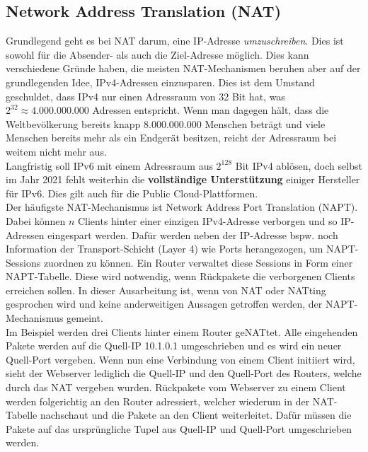\subsection{Network Address Translation (NAT)}
Grundlegend geht es bei NAT darum, eine IP-Adresse \textit{umzuschreiben}. Dies ist sowohl für die Absender- als auch die Ziel-Adresse möglich. Dies kann verschiedene Gründe haben, die meisten NAT-Mechanismen beruhen aber auf der grundlegenden Idee, IPv4-Adressen einzusparen. Dies ist dem Umstand geschuldet, dass IPv4 nur einen Adressraum von 32 Bit hat, was $2^{32} \approx 4.000.000.000$ Adressen entspricht. Wenn man dagegen hält, dass die Weltbevölkerung bereits knapp $8.000.000.000$ Menschen beträgt und viele Menschen bereits mehr als ein Endgerät besitzen, reicht der Adressraum bei weitem nicht mehr aus.\\
Langfristig soll IPv6 mit einem Adressraum aus $2^{128}$ Bit IPv4 ablösen, doch selbst im Jahr 2021 fehlt weiterhin die \textbf{vollständige Unterstützung} einiger Hersteller für IPv6. Dies gilt auch für die Public Cloud-Plattformen.\\
Der häufigste NAT-Mechanismus ist Network Address Port Translation (NAPT). Dabei können $n$ Clients hinter einer einzigen IPv4-Adresse \glqq verborgen\grqq{} und so IP-Adressen eingespart werden. Dafür werden neben der IP-Adresse bspw. noch Information der Transport-Schicht (Layer 4) wie Ports herangezogen, um NAPT-Sessions zuordnen zu können. Ein Router verwaltet diese Sessions in Form einer NAPT-Tabelle. Diese wird notwendig, wenn Rückpakete die verborgenen Clients erreichen sollen.
In dieser Ausarbeitung ist, wenn von NAT oder NATting gesprochen wird und keine anderweitigen Aussagen getroffen werden, der NAPT-Mechanismus gemeint.\\
Im Beispiel werden drei Clients hinter einem Router geNATtet. Alle eingehenden Pakete werden auf die Quell-IP 10.1.0.1 umgeschrieben und es wird ein neuer Quell-Port vergeben. Wenn nun eine Verbindung von einem Client initiiert wird, sieht der Webserver lediglich die Quell-IP und den Quell-Port des Routers, welche durch das NAT vergeben wurden. Rückpakete vom Webserver zu einem Client werden folgerichtig an den Router adressiert, welcher wiederum in der NAT-Tabelle nachschaut und die Pakete an den Client weiterleitet. Dafür müssen die Pakete auf das ursprüngliche Tupel aus Quell-IP und Quell-Port umgeschrieben werden.\\

